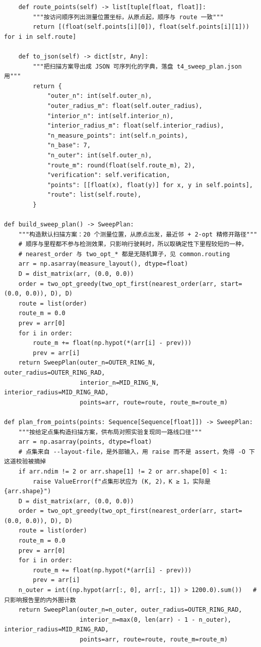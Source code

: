 \documentclass[UTF8, zihao=5,AutoFakeBold=2]{ctexart}
\begin{document}
\begin{lstlisting}
    def route_points(self) -> list[tuple[float, float]]:
        """按访问顺序列出测量位置坐标，从原点起，顺序与 route 一致"""
        return [(float(self.points[i][0]), float(self.points[i][1])) for i in self.route]

    def to_json(self) -> dict[str, Any]:
        """把扫描方案导出成 JSON 可序列化的字典，落盘 t4_sweep_plan.json 用"""
        return {
            "outer_n": int(self.outer_n),
            "outer_radius_m": float(self.outer_radius),
            "interior_n": int(self.interior_n),
            "interior_radius_m": float(self.interior_radius),
            "n_measure_points": int(self.n_points),
            "n_base": 7,
            "n_outer": int(self.outer_n),
            "route_m": round(float(self.route_m), 2),
            "verification": self.verification,
            "points": [[float(x), float(y)] for x, y in self.points],
            "route": list(self.route),
        }

def build_sweep_plan() -> SweepPlan:
    """构造默认扫描方案：20 个测量位置，从原点出发，最近邻 + 2-opt 精修开路径"""
    # 顺序与里程都不参与检测效果，只影响行驶耗时，所以取确定性下里程较短的一种，
    # nearest_order 与 two_opt_* 都是无随机算子，见 common.routing
    arr = np.asarray(measure_layout(), dtype=float)
    D = dist_matrix(arr, (0.0, 0.0))
    order = two_opt_greedy(two_opt_first(nearest_order(arr, start=(0.0, 0.0)), D), D)
    route = list(order)
    route_m = 0.0
    prev = arr[0]
    for i in order:
        route_m += float(np.hypot(*(arr[i] - prev)))
        prev = arr[i]
    return SweepPlan(outer_n=OUTER_RING_N, outer_radius=OUTER_RING_RAD,
                     interior_n=MID_RING_N, interior_radius=MID_RING_RAD,
                     points=arr, route=route, route_m=route_m)

def plan_from_points(points: Sequence[Sequence[float]]) -> SweepPlan:
    """按给定点集构造扫描方案，供布局对照实验复现同一路线口径"""
    arr = np.asarray(points, dtype=float)
    # 点集来自 --layout-file，是外部输入，用 raise 而不是 assert，免得 -O 下这道校验被摘掉
    if arr.ndim != 2 or arr.shape[1] != 2 or arr.shape[0] < 1:
        raise ValueError(f"点集形状应为 (K, 2)，K ≥ 1，实际是 {arr.shape}")
    D = dist_matrix(arr, (0.0, 0.0))
    order = two_opt_greedy(two_opt_first(nearest_order(arr, start=(0.0, 0.0)), D), D)
    route = list(order)
    route_m = 0.0
    prev = arr[0]
    for i in order:
        route_m += float(np.hypot(*(arr[i] - prev)))
        prev = arr[i]
    n_outer = int((np.hypot(arr[:, 0], arr[:, 1]) > 1200.0).sum())   # 只影响报告里的内外圈计数
    return SweepPlan(outer_n=n_outer, outer_radius=OUTER_RING_RAD,
                     interior_n=max(0, len(arr) - 1 - n_outer), interior_radius=MID_RING_RAD,
                     points=arr, route=route, route_m=route_m)


\end{lstlisting}
\end{document}
